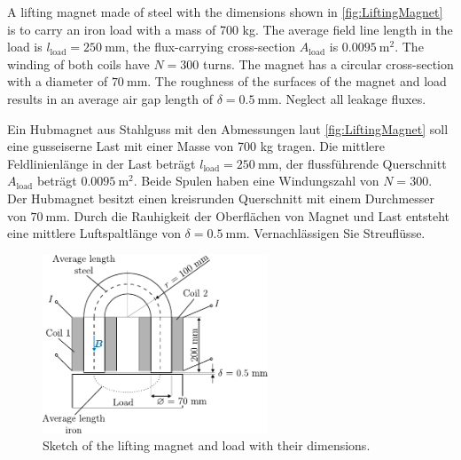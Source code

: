 
A lifting magnet made of steel with the dimensions shown in \autoref{fig:LiftingMagnet} is to carry an iron load with a mass of 700 kg. The average field line length in the load is $l_{\mathrm{load}} = \SI{250}{\milli\metre}$, the flux-carrying cross-section $A_{\mathrm{load}}$ is $\SI{0.0095}{\metre^2}$. The winding of both coils have ${N = 300}$ turns. The magnet has a circular cross-section with a diameter of $\SI{70}{\milli\metre}$. The roughness of the surfaces of the magnet and load results in an average air gap length of $\delta = \SI{0.5}{\milli\metre}$. Neglect all leakage fluxes.





\begin{germanblock}
    Ein Hubmagnet aus Stahlguss mit den Abmessungen laut \autoref{fig:LiftingMagnet} soll eine gusseiserne Last mit einer Masse von 700 kg tragen. Die mittlere Feldlinienlänge in der Last beträgt $l_{\mathrm{load}} = \SI{250}{\milli\metre}$, der flussführende Querschnitt $A_{\mathrm{load}}$ beträgt $\SI{0,0095}{\metre^2}$. Beide Spulen haben eine Windungszahl von ${N = 300}$. Der Hubmagnet besitzt einen kreisrunden Querschnitt mit einem Durchmesser von $\SI{70}{\milli\metre}$. Durch die Rauhigkeit der Oberflächen von Magnet und Last entsteht eine mittlere Luftspaltlänge von $\delta = \SI{0,5}{\milli\metre}$. Vernachlässigen Sie Streuflüsse.
\end{germanblock}

\begin{figure}[h!]
    \centering
    \includegraphics[width=0.6\textwidth]{fig/LiftingMagnet.pdf}
    \caption{Sketch of the lifting magnet and load with their dimensions.}
    \label{fig:LiftingMagnet}
\end{figure}



